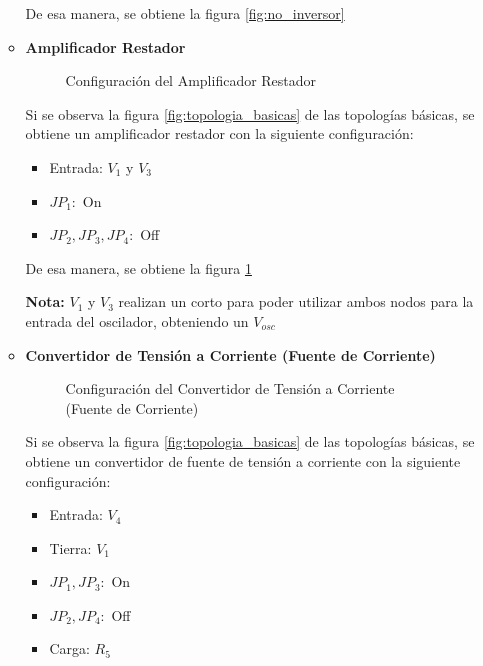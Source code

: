 \begin{enumerate}[label=\textbf{\arabic*.}, font=\bfseries]
\begin{itemize}
        De esa manera, se obtiene la figura \ref{fig:no_inversor}
            

        \item \textbf{Amplificador Restador}

            \begin{figure}[H]
              \centering              
              \caption{Configuración del Amplificador Restador}
              \label{fig:restador}
            \end{figure}
            
            Si se observa la figura \ref{fig:topologia_basicas} de las topologías básicas, se obtiene un amplificador restador con la siguiente configuración:

            \begin{itemize}
                \item  Entrada: $V_1$ y $V_3$
                \item  $JP_1:$ On
                \item  $JP_2,JP_3,JP_4:$ Off
            \end{itemize}
        
        De esa manera, se obtiene la figura \ref{fig:restador}


        \textbf{Nota:} $V_1$ y $V_3$ realizan un corto para poder utilizar ambos nodos para la entrada del oscilador, obteniendo un $V_{osc}$

        \item \textbf{Convertidor de Tensión a Corriente (Fuente de Corriente)}

            \begin{figure}[H]
              \centering              
              \caption{Configuración del Convertidor de Tensión a Corriente (Fuente de Corriente)}
              \label{fig:fuente_de_corriente}
            \end{figure}
            
            Si se observa la figura \ref{fig:topologia_basicas} de las topologías básicas, se obtiene un convertidor de fuente de tensión a corriente con la siguiente configuración:

            \begin{itemize}
                \item  Entrada: $V_4$
                \item  Tierra: $V_1$
                \item  $JP_1,JP_3:$ On
                \item  $JP_2,JP_4:$ Off
                \item  Carga: $R_5$
            \end{itemize}
        

\end{itemize}
\end{enumerate}
